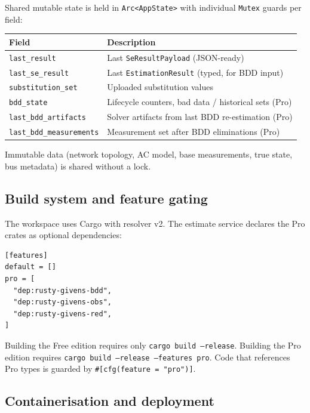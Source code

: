 \documentclass[11pt,a4paper]{article}
\begin{document}
Shared mutable state is held in \texttt{Arc<AppState>} with individual
\texttt{Mutex} guards per field:

\begin{center}
\small
\begin{tabular}{lp{65mm}}
  \toprule
  \textbf{Field} & \textbf{Description} \\
  \midrule
  \texttt{last\_result}             & Last \texttt{SeResultPayload} (JSON-ready) \\
  \texttt{last\_se\_result}         & Last \texttt{EstimationResult} (typed, for BDD input) \\
  \texttt{substitution\_set}        & Uploaded substitution values \\
  \texttt{bdd\_state}               & Lifecycle counters, bad data / historical sets (Pro) \\
  \texttt{last\_bdd\_artifacts}     & Solver artifacts from last BDD re-estimation (Pro) \\
  \texttt{last\_bdd\_measurements}  & Measurement set after BDD eliminations (Pro) \\
  \bottomrule
\end{tabular}
\end{center}

\noindent
Immutable data (network topology, AC model, base measurements, true state,
bus metadata) is shared without a lock.

\subsection{Build system and feature gating}

The workspace uses Cargo with resolver v2.  The estimate service declares
the Pro crates as optional dependencies:

\begin{lstlisting}[language={}]
[features]
default = []
pro = [
  "dep:rusty-givens-bdd",
  "dep:rusty-givens-obs",
  "dep:rusty-givens-red",
]
\end{lstlisting}

Building the Free edition requires only \texttt{cargo build --release}.
Building the Pro edition requires \texttt{cargo build --release --features pro}.
Code that references Pro types is guarded by \texttt{\#[cfg(feature = "pro")]}.

\subsection{Containerisation and deployment}\label{sec:deploy}
\end{document}
